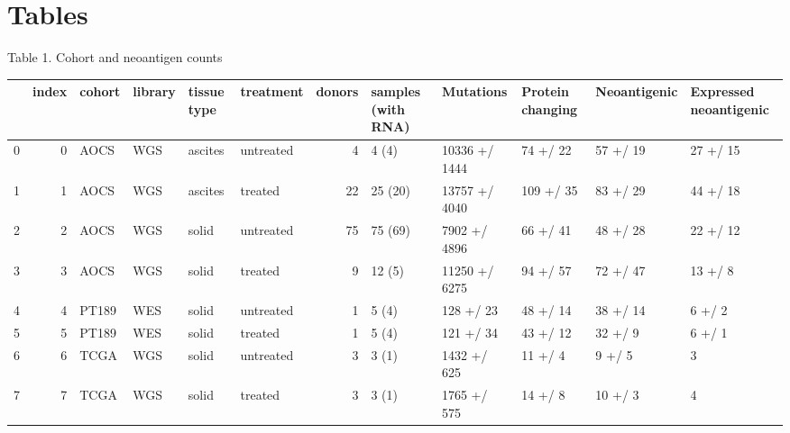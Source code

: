 \section{Tables}

Table 1. Cohort and neoantigen counts

\begin{tabular}{lrllllrlllll}
\toprule
{} &  index & cohort & library & tissue type &  treatment &  donors & samples (with RNA) &      Mutations & Protein changing & Neoantigenic & Expressed neoantigenic \\
\midrule
0 &      0 &   AOCS &     WGS &     ascites &  untreated &       4 &              4 (4) &  10336 +/ 1444 &         74 +/ 22 &     57 +/ 19 &               27 +/ 15 \\
1 &      1 &   AOCS &     WGS &     ascites &    treated &      22 &            25 (20) &  13757 +/ 4040 &        109 +/ 35 &     83 +/ 29 &               44 +/ 18 \\
2 &      2 &   AOCS &     WGS &       solid &  untreated &      75 &            75 (69) &   7902 +/ 4896 &         66 +/ 41 &     48 +/ 28 &               22 +/ 12 \\
3 &      3 &   AOCS &     WGS &       solid &    treated &       9 &             12 (5) &  11250 +/ 6275 &         94 +/ 57 &     72 +/ 47 &                13 +/ 8 \\
4 &      4 &  PT189 &     WES &       solid &  untreated &       1 &              5 (4) &      128 +/ 23 &         48 +/ 14 &     38 +/ 14 &                 6 +/ 2 \\
5 &      5 &  PT189 &     WES &       solid &    treated &       1 &              5 (4) &      121 +/ 34 &         43 +/ 12 &      32 +/ 9 &                 6 +/ 1 \\
6 &      6 &   TCGA &     WGS &       solid &  untreated &       3 &              3 (1) &    1432 +/ 625 &          11 +/ 4 &       9 +/ 5 &                      3 \\
7 &      7 &   TCGA &     WGS &       solid &    treated &       3 &              3 (1) &    1765 +/ 575 &          14 +/ 8 &      10 +/ 3 &                      4 \\
\bottomrule
\end{tabular}